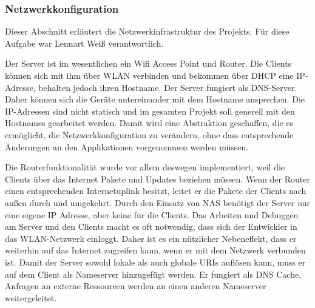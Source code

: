 \subsubsection{Netzwerkkonfiguration}

Dieser Abschnitt erläutert die Netzwerkinfrastruktur des Projekts.
Für diese Aufgabe war Lennart Weiß verantwortlich.

Der Server ist im wesentlichen ein Wifi Access Point und Router.
Die Clients können sich mit ihm über WLAN verbinden und bekommen über DHCP eine IP-Adresse, behalten
jedoch ihren Hostname.
Der Server fungiert als DNS-Server.
Daher können sich die Geräte untereinander mit dem Hostname ansprechen.
Die IP-Adressen sind nicht statisch und im gesamten Projekt soll generell mit den Hostnames
gearbeitet werden.
Damit wird eine Abstraktion geschaffen, die es ermöglicht, die Netzwerkkonfiguration zu verändern,
ohne dass entsprechende Änderungen an den Applikationen vorgenommen werden müssen.

Die Routerfunktionalität wurde vor allem deswegen implementiert, weil die Clients über das Internet
Pakete und Updates beziehen müssen.
Wenn der Router einen entsprechenden Internetuplink besitzt, leitet er die Pakete der Clients nach
außen durch und umgekehrt.
Durch den Einsatz von NAS benötigt der Server nur eine eigene IP Adresse, aber keine für die
Clients.
Das Arbeiten und Debuggen am Server und den Clients macht es oft notwendig, dass sich der Entwickler
in das WLAN-Netzwerk einloggt.
Daher ist es ein nützlicher Nebeneffekt, dass er weiterhin auf das Internet zugreifen kann, wenn er
mit dem Netzwerk verbunden ist.
Damit der Server sowohl lokale als auch globale URIs auflösen kann, muss er auf dem Client als
Nameserver hinzugefügt werden.
Er fungiert als DNS Cache, Anfragen an externe Ressourcen werden an einen anderen Nameserver
weitergeleitet.
